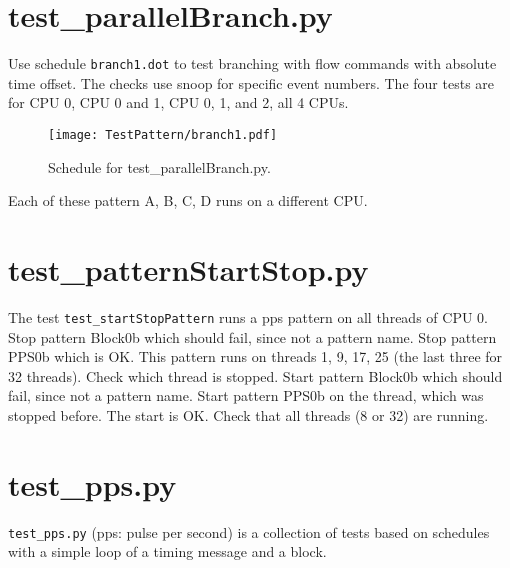 \documentclass[12pt,a4paper]{report}
\begin{document}
\section{test\_parallelBranch.py}
Use schedule \texttt{branch1.dot} to test branching with flow commands
with absolute time offset. The checks use snoop for specific event numbers.
The four tests are for CPU 0, CPU 0 and 1, CPU 0, 1, and 2, all 4 CPUs.
    \begin{figure}
        \centering
        \texttt{[image: TestPattern/branch1.pdf]}
        \caption{Schedule for test\_parallelBranch.py.}
        \label{fig:Pattern_for_test_parallelBranch}
    \end{figure}
    Each of these pattern A, B, C, D runs on a different CPU.

\section{test\_patternStartStop.py}
The test \texttt{test\_startStopPattern} runs a pps pattern on all threads of CPU 0.
    Stop pattern Block0b which should fail, since not a pattern name.
    Stop pattern PPS0b which is OK. This pattern runs on threads 1, 9, 17, 25
    (the last three for 32 threads). Check which thread is stopped.
    Start pattern Block0b which should fail, since not a pattern name.
    Start pattern PPS0b on the thread, which was stopped before. The start
    is OK. Check that all threads (8 or 32) are running.

\section{test\_pps.py}
\texttt{test\_pps.py} (pps: pulse per second) is a collection of tests based
on schedules with a simple loop of a timing message and a block.
\end{document}
